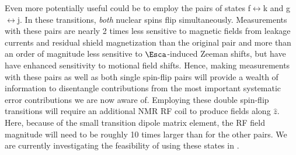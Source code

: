 Even more potentially useful could be to employ the pairs of states f$\leftrightarrow$k and g$\leftrightarrow$j.  In these transitions, \textit{both} nuclear spins flip simultaneously. Measurements with these pairs are nearly 2 times less sensitive to magnetic fields from leakage currents and residual shield magnetization than the original pair and more than an order of magnitude less sensitive to $\Esca$-induced Zeeman shifts, but have have enhanced sensitivity to motional field shifts.  Hence, making measurements with these pairs as well as both single spin-flip pairs will provide a wealth of information to disentangle contributions from the most important systematic error contributions we are now aware of.  Employing these double spin-flip transitions will require an additional NMR RF coil to produce fields along $\hat{z}$. Here, because of the small transition dipole matrix element, the RF field magnitude will need to be roughly 10 times larger than for the other pairs.  We are currently investigating the feasibility of using these states in \CENTREX.